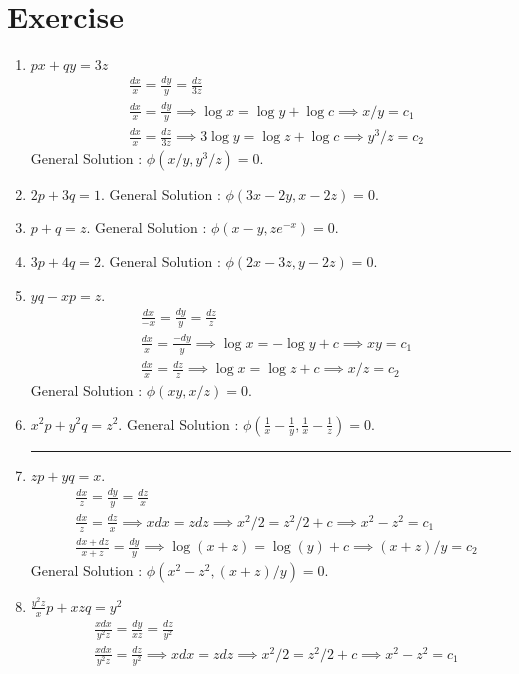 \section{Exercise}
\begin{enumerate}
	\item $px + qy = 3z$
	\begin{align*}
		& \frac{dx}{x} = \frac{dy}{y} = \frac{dz}{3z}\\
		& \frac{dx}{x} = \frac{dy}{y} \implies \log x = \log y + \log c \implies x/y = c_1 \\
		& \frac{dx}{x} = \frac{dz}{3z} \implies 3\log y = \log z + \log c \implies y^3/z = c_2
	\end{align*}
		General Solution : $\phi(x/y,y^3/z) = 0$.
	\item $2p + 3q = 1$.
		General Solution : $\phi(3x-2y,x-2z) = 0$.
	\item $p+q = z$.
		General Solution : $\phi(x-y,ze^{-x}) = 0$.
	\item $3p+4q = 2$.
		General Solution : $\phi(2x-3z,y-2z) = 0$.
	\item $yq - xp = z$.
		\begin{align*}
			& \frac{dx}{-x} = \frac{dy}{y} = \frac{dz}{z} \\
			& \frac{dx}{x} = \frac{-dy}{y} \implies \log x = -\log y + c \implies xy = c_1 \\
			& \frac{dx}{x} = \frac{dz}{z} \implies \log x = \log z + c \implies x/z = c_2
		\end{align*}
		General Solution : $\phi(xy,x/z) = 0$.
	\item $x^2p + y^2q = z^2$.
		General Solution : $\phi(\frac{1}{x}-\frac{1}{y},\frac{1}{x}-\frac{1}{z}) = 0$.
		\hrule
	\item $zp + yq = x$.
	\begin{align*}
		& \frac{dx}{z} = \frac{dy}{y} = \frac{dz}{x} \\
		& \frac{dx}{z} = \frac{dz}{x} \implies xdx = zdz \implies x^2/2 = z^2/2 +c \implies x^2-z^2 = c_1\\
		& \frac{dx+dz}{x+z} = \frac{dy}{y} \implies \log(x+z) = \log(y)+c \implies (x+z)/y = c_2
	\end{align*}
		General Solution : $\phi(x^2-z^2,(x+z)/y) = 0$.
	\item $\frac{y^2z}{x}p + xzq = y^2$
		\begin{align*}
			& \frac{xdx}{y^2z} = \frac{dy}{xz} = \frac{dz}{y^2} \\
			& \frac{xdx}{y^2z} = \frac{dz}{y^2} \implies xdx = zdz \implies x^2/2 = z^2/2 + c \implies x^2-z^2 = c_1 \\

\end{align*}
\end{enumerate}
